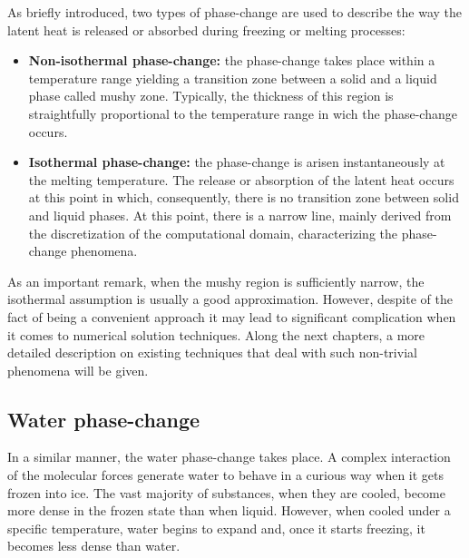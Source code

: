 As briefly introduced, two types of phase-change are used to describe the way the latent heat is released or absorbed during freezing or melting processes:
\begin{itemize}
	\item \textbf{Non-isothermal phase-change:} the phase-change takes place within a temperature range yielding a transition zone between a solid and a liquid phase called mushy zone. Typically, the thickness of this region is straightfully proportional to the temperature range in wich the phase-change occurs.
	\item \textbf{Isothermal phase-change:} the phase-change is arisen instantaneously at the melting temperature. The release or absorption of the latent heat occurs at this point in which, consequently, there is no transition zone between solid and liquid phases. At this point, there is a narrow line, mainly derived from the discretization of the computational domain, characterizing the phase-change phenomena.
\end{itemize}
As an important remark, when the mushy region is sufficiently narrow, the isothermal assumption is usually a good approximation. However, despite of the fact of being a convenient approach it may lead to significant complication when it comes to numerical solution techniques. 
\newline
Along the next chapters, a more detailed description on existing techniques that deal with such non-trivial phenomena will be given.

\subsection{Water phase-change}
In a similar manner, the water phase-change takes place. A complex interaction of the molecular forces generate water to behave in a curious way when it gets frozen into ice. The vast majority of substances, when they are cooled, become more dense in the frozen state than when liquid. However, when cooled under a specific temperature, water begins to expand and, once it starts freezing, it becomes less dense than water. 
\newline
